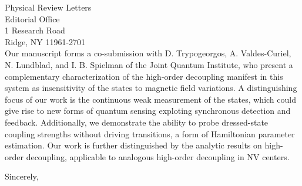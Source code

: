 \documentclass[10pt,letterpaper]{letter} %
\begin{document}
\begin{letter}{
	Physical Review Letters\\
	Editorial Office\\
	1 Research Road \\
	Ridge, NY 11961-2701\\
}
Our manuscript forms a co-submission with D. Trypogeorgos, A. Valdes-Curiel, N. Lundblad, and I. B. Spielman of the Joint Quantum Institute, who present a complementary characterization of the high-order decoupling manifest in this system as insensitivity of the states to magnetic field variations.
A distinguishing focus of our work is the continuous weak measurement of the states, which could give rise to new forms of quantum sensing exploting synchronous detection and feedback.
Additionally, we demonstrate the ability to probe dressed-state coupling strengths without driving transitions, a form of Hamiltonian parameter estimation.
Our work is further distinguished by the analytic results on high-order decoupling, applicable to analogous high-order decoupling in NV centers.

\closing{Sincerely,}




\end{letter}
\end{document}
